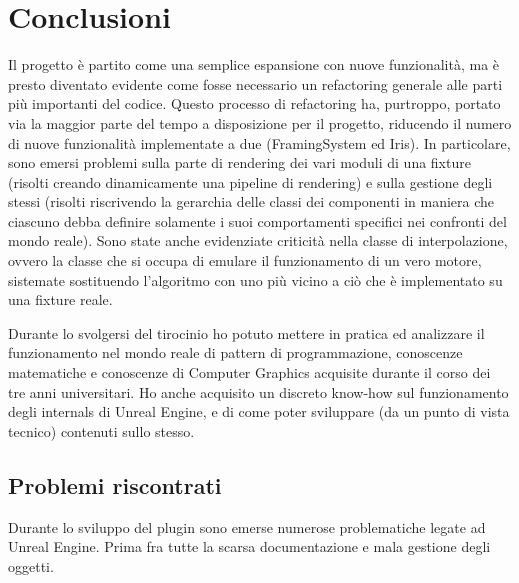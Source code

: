 \documentclass[main.tex]{subfiles}
\begin{document}
\sloppy


\vspace{1.0cm}

\section{Conclusioni}\label{sec:End}
Il progetto è partito come una semplice espansione con nuove funzionalità, ma è presto diventato evidente come fosse necessario un refactoring generale alle parti più importanti del codice. Questo processo di refactoring ha, purtroppo, portato via la maggior parte del tempo a disposizione per il progetto, riducendo il numero di nuove funzionalità implementate a due (FramingSystem ed Iris). In particolare, sono emersi problemi sulla parte di rendering dei vari moduli di una fixture (risolti creando dinamicamente una pipeline di rendering) e sulla gestione degli stessi (risolti riscrivendo la gerarchia delle classi dei componenti in maniera che ciascuno debba definire solamente i suoi comportamenti specifici nei confronti del mondo reale). Sono state anche evidenziate criticità nella classe di interpolazione, ovvero la classe che si occupa di emulare il funzionamento di un vero motore, sistemate sostituendo l'algoritmo con uno più vicino a ciò che è implementato su una fixture reale.

Durante lo svolgersi del tirocinio ho potuto mettere in pratica ed analizzare il funzionamento nel mondo reale di pattern di programmazione, conoscenze matematiche e conoscenze di Computer Graphics acquisite durante il corso dei tre anni universitari. Ho anche acquisito un discreto know-how sul funzionamento degli internals di Unreal Engine, e di come poter sviluppare (da un punto di vista tecnico) contenuti sullo stesso. 

\subsection{Problemi riscontrati}\label{subsec:6_Problems}
Durante lo sviluppo del plugin sono emerse numerose problematiche legate ad Unreal Engine. Prima fra tutte la scarsa documentazione e mala gestione degli oggetti.\newline
\end{document}
